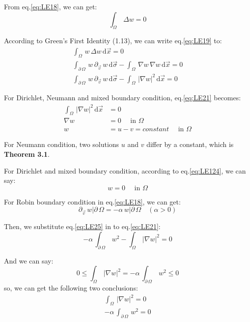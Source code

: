 \documentclass[../main.tex]{subfiles}
\begin{document}
From eq.\ref{eq:LE18}, we can get:
\begin{equation} \label{eq:LE19}
    \int_{\Omega} \, \Delta w = 0
\end{equation}

According to Green's First Identity (1.13), we can write eq.\ref{eq:LE19} to:
\begin{align}
    \int_{\Omega} \, w \, \Delta w \, \mathrm{d} \vec{x}= 0 \label{eq:LE20} \\
    \int_{\partial \, \Omega} \, w \, \partial_{\vec{v}} \, w \, \mathrm{d} \vec{\sigma} - \int_{\Omega} \, \nabla w \, \nabla w \, \mathrm{d} \vec{x} = 0 \nonumber \\
    \int_{\partial \, \Omega} \, w \, \partial_{\vec{v}} \, w \, \mathrm{d} \vec{\sigma} - \int_{\Omega} \, |\nabla w|^2 \, \mathrm{d} \vec{x} = 0 \label{eq:LE21}
\end{align}

For Dirichlet, Neumann and mixed boundary condition, eq.\ref{eq:LE21} becomes:
\begin{align}
    \int_{\Omega} \, |\nabla w|^2 \, \mathrm{d} \vec{x} &= 0 \label{eq:LE22} \\
    \nabla w &= 0 \quad \text{ in  } \Omega \label{eq:LE23} \\
    w &= u - v = constant \quad \text{ in  } \Omega \label{eq:LE124}
\end{align}

For Neumann condition, two solutions $u$ and $v$ differ by a constant, which is \textbf{Theorem 3.1}. \hfill \Box

For Dirichlet and mixed boundary condition, according to eq.\ref{eq:LE124}, we can say:
\begin{equation} \label{eq:LE24}
    w = 0 \quad \text{ in  } \Omega
\end{equation}

For Robin boundary condition in eq.\ref{eq:LE18}, we can get:
\begin{equation} \label{eq:LE25}
    \partial_{\vec{v}} \, w|\partial \, \Omega = - \alpha \, w|\partial \, \Omega \quad (\alpha > 0)
\end{equation}

Then, we substitute eq.\ref{eq:LE25} in to eq.\ref{eq:LE21}:
\begin{equation} \label{eq:LE26}
    - \alpha \, \int_{\partial \, \Omega} \, w^2 - \int_{\Omega} \, |\nabla w|^2 = 0
\end{equation}

And we can say:
\begin{equation} \label{eq:LE27}
    0 \leqslant \int_{\Omega} \, |\nabla w|^2 = - \alpha \, \int_{\partial \, \Omega} \, w^2 \leqslant 0
\end{equation}
so, we can get the following two conclusions:
\begin{align}
    \int_{\Omega} \, |\nabla w|^2 = 0  \label{eq:LE28} \\
    - \alpha \, \int_{\partial \, \Omega} \, w^2 = 0 \label{eq:LE29}
\end{align}
\end{document}

